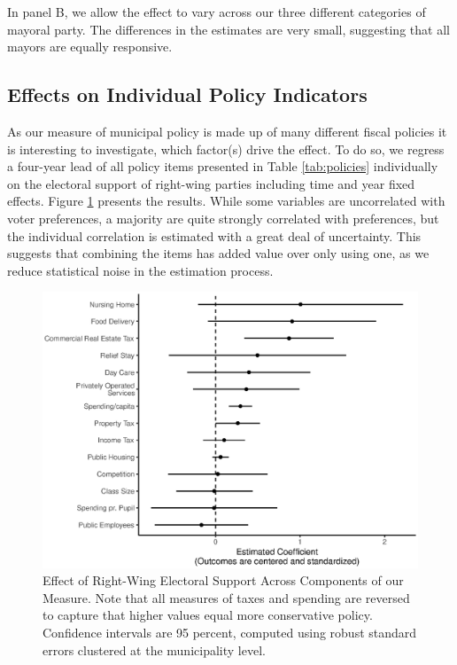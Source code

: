 \documentclass[a4paper,12pt]{article}
\begin{document}
In panel B, we allow the effect to vary across our three different categories of mayoral party. The differences in the estimates are very small, suggesting that all mayors are equally responsive.

\clearpage

\subsection{Effects on Individual Policy Indicators}
\label{item}
\setcounter{table}{0}
\setcounter{figure}{0}


As our measure of municipal policy is made up of many different fiscal policies it is interesting to investigate, which factor(s) drive the effect. To do so, we regress a four-year lead of all policy items presented in Table \ref{tab:policies} individually on the electoral support of right-wing parties including time and year fixed effects. Figure \ref{fig:item} presents the results. While some variables are uncorrelated with voter preferences, a majority are quite strongly correlated with preferences, but the individual correlation is estimated with a great deal of uncertainty. This suggests that combining the items has added value over only using one, as we reduce statistical noise in the estimation process. 

\begin{figure}[!htb]
	\centering
	\includegraphics[scale = 1]{ItemByItem_18092018.eps}
	\caption{Effect of Right-Wing Electoral Support Across Components of our Measure. Note that all measures of taxes and spending are reversed to capture that higher values equal more conservative policy. Confidence intervals are 95 percent, computed using robust standard errors clustered at the municipality level.} \label{fig:item}
\end{figure}
\clearpage
\end{document}
